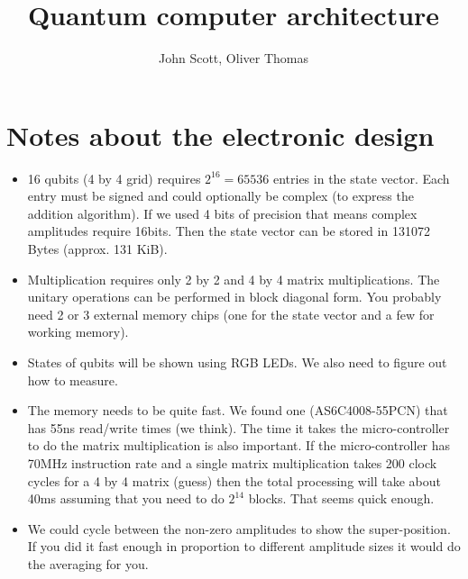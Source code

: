 \documentclass{article}
\begin{document}
\title{Quantum computer architecture}
 \author{John Scott, Oliver Thomas}
\maketitle


\section{Notes about the electronic design}

\begin{itemize}
    \item 16 qubits (4 by 4 grid) requires $2^{16}=65536$ entries in the state vector. Each entry must be signed and could optionally be complex (to express the addition algorithm). If we used 4 bits of precision that means complex amplitudes require 16bits. Then the state vector can be stored in 131072 Bytes (approx. 131 KiB).

\item Multiplication requires only 2 by 2 and 4 by 4 matrix multiplications. The unitary operations can be performed in block diagonal form. You probably need 2 or 3 external memory chips (one for the state vector and a few for working memory).

\item States of qubits will be shown using RGB LEDs. We also need to figure out how to measure.

\item The memory needs to be quite fast. We found one (AS6C4008-55PCN) that has 55ns
    read/write times (we think). The time it takes the micro-controller to do the matrix
    multiplication is also important. If the micro-controller has 70MHz instruction rate
    and a single matrix multiplication takes 200 clock cycles for a 4 by 4 matrix (guess)
    then the total processing will take about 40ms assuming that you need to do $2^{14}$ blocks. That seems quick enough.
  
\item We could cycle between the non-zero amplitudes to show the super-position. If you
    did it fast enough in proportion to different amplitude sizes it would do the
    averaging for you.
    
\end{itemize}
\end{document}
